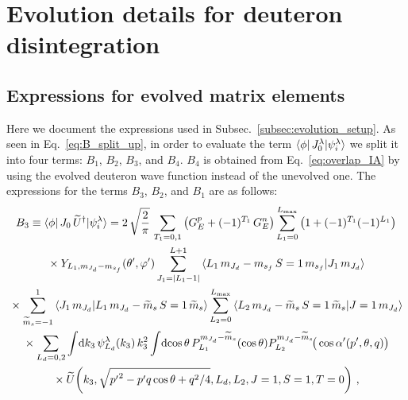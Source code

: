 \cleardoublepage
\chapter{Evolution details for deuteron disintegration}
\label{Appendix:evolution_details}

  \section{Expressions for evolved matrix elements}
  \label{Appendix:sec:evolution_expressions}

  Here we document the expressions used in Subsec.~\ref{subsec:evolution_setup}.
  As seen in Eq.~\eqref{eq:B_split_up}, in order to evaluate the term $\langle \phi|
  \, J_0^\lambda | \psi_i^\lambda \rangle$ we split it into four terms: $B_1$,
  $B_2$, $B_3$, and $B_4$.  $B_4$ is obtained from Eq.~\eqref{eq:overlap_IA} by
  using the evolved deuteron wave function instead of the unevolved one.  The
  expressions for the terms $B_3$, $B_2$, and $B_1$ are as follows:
  \begin{multline}
   B_3 \equiv \la \phi | \, J_0 \, \widetilde{U}^\dag | \psi_i^\lambda \ra
   = 2 \, \sqrt{\frac{2}{\pi}} \,
   \sum_{T_1 = 0,1} \big(G_E ^p + (-1)^{T_1} \, G_E^n\big)
   \sum_{L_1 = 0}^{L_{\rm max}} \big(1 + (-1)^{T_1} (-1)^{L_1}\big) \\
   \null \times Y_{L_1 , \mJd - \msf} (\thetacm, \phicm)
   \sum_{J_1 = |L_1 - 1|}^{L+1}
   \CG{L_1}{\mJd - \msf}{S=1}{\msf}{J_1}{\mJd} \\
   \null \times \sum_{\widetilde{m}_s = -1}^1
   \braket{J_1 \, \mJd}{L_1 \, \mJd - \wt{m}_s \, S=1 \, \wt{m}_s}
   \sum_{L_2 = 0}^{L_{\rm max}}
   \CG{L_2}{\mJd-\widetilde{m}_s}{S=1}{\widetilde{m}_s}{J=1}{\mJd} \\
   \null \times \sum_{L_d = 0, 2}
   \int \! \dd k_3 \, \psi_{L_d}^\lambda(k_3) \, k_3^2 \int \! \dcostheta \,
    P_{L_1}^{\mJd-\widetilde{m}_s}(\cos \theta)
    P_{L_2}^{\mJd-\widetilde{m}_s}\!\big(\cos\thetacprime(\pp, \theta, q)\big)
    \\ \null \times
    \widetilde{U}\!\left(
     k_3, \sqrt{{\pp}^2 - \pp q \cos\theta + q^2/4}, L_d, L_2, J=1, S=1, T=0
    \right) \,,
  \end{multline}
